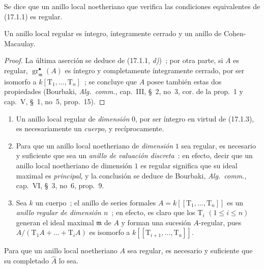 \begin{definition}[17.1.2]
\label{0.17.1.2-es}
Se dice que un anillo local noetheriano que verifica las condiciones equivalentes de
\textup{(17.1.1)} es regular.
\end{definition}

\begin{corollary}[17.1.3]
\label{0.17.1.3-es}
Un anillo local regular es íntegro, íntegramente cerrado y un anillo de
Cohen-Macaulay.
\end{corollary}

\begin{proof}
La última aserción se deduce de (17.1.1, \emph{d)})~; por otra parte, si $A$ es
regular, $\operatorname{gr}^\bullet_{\mathfrak{m}}(A)$ es íntegro y completamente
íntegramente cerrado, por ser isomorfo a $k[\mathrm{T}_1,\ldots,\mathrm{T}_n]$~;
se concluye que $A$ posee también estas dos propiedades (Bourbaki,
\emph{Alg.~comm.}, cap.~III, \S~2, no~3, cor. de la prop.~1 y cap.~V,
\S~1, no~5, prop.~15).
\end{proof}

\begin{examples}[17.1.4]
\label{0.17.1.4-es}
\begin{enumerate}
  \item[\rm (i)] Un anillo local regular de \emph{dimensión} $0$, por ser
  íntegro en virtud de (17.1.3), es necesariamente un \emph{cuerpo}, y recíprocamente.
  \item[\rm (ii)] Para que un anillo local noetheriano de \emph{dimensión} $1$
  sea regular, es necesario y suficiente que sea un \emph{anillo de valuación
  discreta}~: en efecto, decir que un anillo local noetheriano de dimensión $1$ es
  regular significa que su ideal maximal es \emph{principal}, y la conclusión
  se deduce de Bourbaki, \emph{Alg.~comm.}, cap.~VI, \S~3, no~6, prop.~9.
  \item[\rm (iii)] Sea $k$ un cuerpo~; el anillo de series formales
  $A=k[[\mathrm{T}_1,\ldots,\mathrm{T}_n]]$ es un \emph{anillo regular de
  dimensión $n$}~; en efecto, es claro que los $\mathrm{T}_i$
  $(1\leq i\leq n)$ generan el ideal maximal $\mathfrak{m}$ de $A$ y
  forman una sucesión $A$-regular, pues
  $A/(\mathrm{T}_1A+\ldots+\mathrm{T}_iA)$ es isomorfo a
  $k[[\mathrm{T}_{i+1},\ldots,\mathrm{T}_n]]$.
\end{enumerate}
\end{examples}

\begin{proposition}[17.1.5]
\label{0.17.1.5-es}
Para que un anillo local noetheriano $A$ sea regular, es necesario y suficiente que
su completado $\widehat{A}$ lo sea.
\end{proposition}

